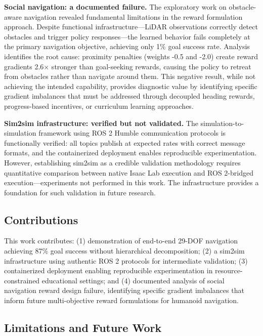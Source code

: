 \documentclass[12pt,a4paper]{article}
\begin{document}
\textbf{Social navigation: a documented failure.} The exploratory work on obstacle-aware navigation revealed fundamental limitations in the reward formulation approach. Despite functional infrastructure---LiDAR observations correctly detect obstacles and trigger policy responses---the learned behavior fails completely at the primary navigation objective, achieving only 1\% goal success rate. Analysis identifies the root cause: proximity penalties (weights -0.5 and -2.0) create reward gradients 2.6$\times$ stronger than goal-seeking rewards, causing the policy to retreat from obstacles rather than navigate around them. This negative result, while not achieving the intended capability, provides diagnostic value by identifying specific gradient imbalances that must be addressed through decoupled heading rewards, progress-based incentives, or curriculum learning approaches.

\textbf{Sim2sim infrastructure: verified but not validated.} The simulation-to-simulation framework using ROS 2 Humble communication protocols is functionally verified: all topics publish at expected rates with correct message formats, and the containerized deployment enables reproducible experimentation. However, establishing sim2sim as a credible validation methodology requires quantitative comparison between native Isaac Lab execution and ROS 2-bridged execution---experiments not performed in this work. The infrastructure provides a foundation for such validation in future research.

\subsection{Contributions}

This work contributes: (1) demonstration of end-to-end 29-DOF navigation achieving 87\% goal success without hierarchical decomposition; (2) a sim2sim infrastructure using authentic ROS 2 protocols for intermediate validation; (3) containerized deployment enabling reproducible experimentation in resource-constrained educational settings; and (4) documented analysis of social navigation reward design failure, identifying specific gradient imbalances that inform future multi-objective reward formulations for humanoid navigation.

\subsection{Limitations and Future Work}
\end{document}
